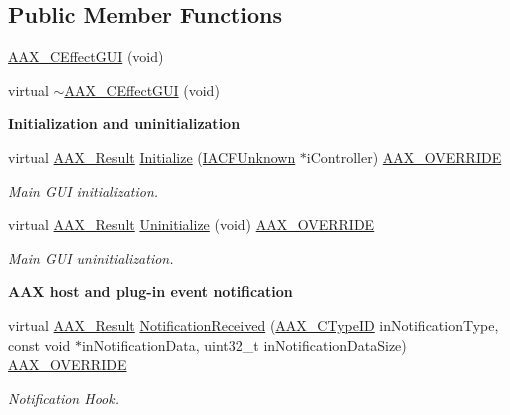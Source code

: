 \subsection*{Public Member Functions}
\begin{DoxyCompactItemize}
\item 
\hyperlink{a00017_aff1112d89b87c0eaa94b9ed149134ce6}{A\+A\+X\+\_\+\+C\+Effect\+G\+U\+I} (void)
\item 
virtual \hyperlink{a00017_ae3e6b1441932ff2a67e3e80e80488ebc}{$\sim$\+A\+A\+X\+\_\+\+C\+Effect\+G\+U\+I} (void)
\end{DoxyCompactItemize}
\begin{Indent}{\bf Initialization and uninitialization}\par
\begin{DoxyCompactItemize}
\item 
virtual \hyperlink{a00149_a4d8f69a697df7f70c3a8e9b8ee130d2f}{A\+A\+X\+\_\+\+Result} \hyperlink{a00017_ab4c4643bf3b7a162d91bdf142870918f}{Initialize} (\hyperlink{a00146}{I\+A\+C\+F\+Unknown} $\ast$i\+Controller) \hyperlink{a00149_ac2f24a5172689ae684344abdcce55463}{A\+A\+X\+\_\+\+O\+V\+E\+R\+R\+I\+D\+E}
\begin{DoxyCompactList}\small\item\em Main G\+U\+I initialization. \end{DoxyCompactList}\item 
virtual \hyperlink{a00149_a4d8f69a697df7f70c3a8e9b8ee130d2f}{A\+A\+X\+\_\+\+Result} \hyperlink{a00017_a28bf9f87aca2d9639000f35f25c1929e}{Uninitialize} (void) \hyperlink{a00149_ac2f24a5172689ae684344abdcce55463}{A\+A\+X\+\_\+\+O\+V\+E\+R\+R\+I\+D\+E}
\begin{DoxyCompactList}\small\item\em Main G\+U\+I uninitialization. \end{DoxyCompactList}\end{DoxyCompactItemize}
\end{Indent}
\begin{Indent}{\bf A\+A\+X host and plug-\/in event notification}\par
\begin{DoxyCompactItemize}
\item 
virtual \hyperlink{a00149_a4d8f69a697df7f70c3a8e9b8ee130d2f}{A\+A\+X\+\_\+\+Result} \hyperlink{a00017_a8cbef7a88dce07afc5c21357769bf043}{Notification\+Received} (\hyperlink{a00149_ac678f9c1fbcc26315d209f71a147a175}{A\+A\+X\+\_\+\+C\+Type\+I\+D} in\+Notification\+Type, const void $\ast$in\+Notification\+Data, uint32\+\_\+t in\+Notification\+Data\+Size) \hyperlink{a00149_ac2f24a5172689ae684344abdcce55463}{A\+A\+X\+\_\+\+O\+V\+E\+R\+R\+I\+D\+E}
\begin{DoxyCompactList}\small\item\em Notification Hook. \end{DoxyCompactList}\end{DoxyCompactItemize}
\end{Indent}
